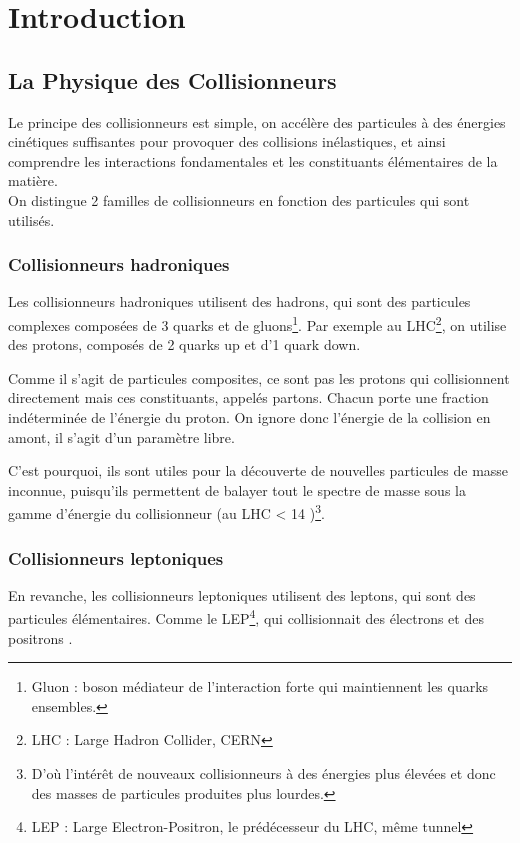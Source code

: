 
\chapter{Introduction}

\section{La Physique des Collisionneurs}

Le principe des collisionneurs est simple, on accélère des particules à des 
énergies cinétiques suffisantes pour provoquer des collisions inélastiques, et ainsi comprendre les interactions fondamentales et les constituants élémentaires de la matière.\\

On distingue 2 familles de collisionneurs en fonction des particules qui sont utilisés.

\subsection{Collisionneurs hadroniques}

Les collisionneurs hadroniques utilisent des hadrons, qui sont des 
particules complexes composées de 3 quarks et de gluons\footnote{Gluon : boson médiateur de l'interaction forte qui maintiennent les quarks ensembles.}. 
Par exemple au LHC\footnote{LHC : Large Hadron Collider, CERN}, on utilise des protons, composés de 2 quarks up et d'1 quark down. 

Comme il s'agit de particules composites, ce sont pas les protons qui collisionnent directement mais ces constituants, appelés partons. 
Chacun porte une fraction indéterminée de l'énergie du proton. 
On ignore donc l'énergie de la collision en amont, il s'agit d'un paramètre libre. 

C'est pourquoi, ils sont utiles pour la découverte de nouvelles particules de masse inconnue, puisqu'ils permettent de balayer tout le spectre de masse sous la gamme d'énergie du collisionneur (au LHC < 14 \TeV)\footnote{D'où l'intérêt de nouveaux collisionneurs à des énergies plus élevées et donc des masses de particules produites plus lourdes.}.

\subsection{Collisionneurs leptoniques}

En revanche, les collisionneurs leptoniques utilisent des leptons, qui sont des particules élémentaires. 
Comme le LEP\footnote{LEP : Large Electron-Positron, le prédécesseur du LHC, même tunnel}, qui collisionnait des électrons et des positrons \cite{cern:lep}.

